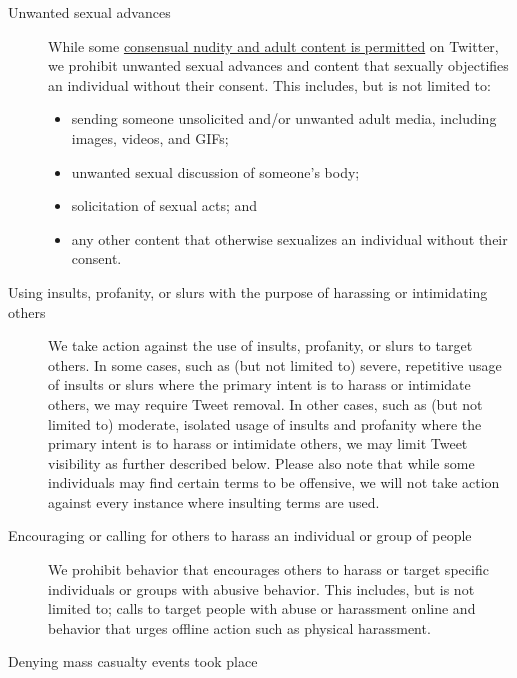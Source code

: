 \begin{description}
\item[Unwanted sexual advances] \hfill

    While some
    \href{https://web.archive.org/web/20220905021323/https://help.twitter.com/en/rules-and-policies/media-policy.html}{consensual
    nudity and adult content is permitted} on Twitter, we prohibit unwanted
    sexual advances and content that sexually objectifies an individual without
    their consent. This includes, but is not limited to:

    \begin{itemize}
    \item sending someone unsolicited and/or unwanted adult media, including
        images, videos, and GIFs;
    \item unwanted sexual discussion of someone's body;
    \item solicitation of sexual acts; and
    \item any other content that otherwise sexualizes an individual without
        their consent.
    \end{itemize}

\item[Using insults, profanity, or slurs with the purpose of harassing or
    intimidating others] \hfill

    We take action against the use of insults, profanity, or slurs to target
    others. In some cases, such as (but not limited to) severe, repetitive usage
    of insults or slurs where the primary intent is to harass or intimidate
    others, we may require Tweet removal. In other cases, such as (but not
    limited to) moderate, isolated usage of insults and profanity where the
    primary intent is to harass or intimidate others, we may limit Tweet
    visibility as further described below. Please also note that while some
    individuals may find certain terms to be offensive, we will not take action
    against every instance where insulting terms are used.

\item[Encouraging or calling for others to harass an individual or group of
    people] \hfill

    We prohibit behavior that encourages others to harass or target specific
    individuals or groups with abusive behavior. This includes, but is not
    limited to; calls to target people with abuse or harassment online and
    behavior that urges offline action such as physical harassment.

\item[Denying mass casualty events took place] \hfill


\end{description}
